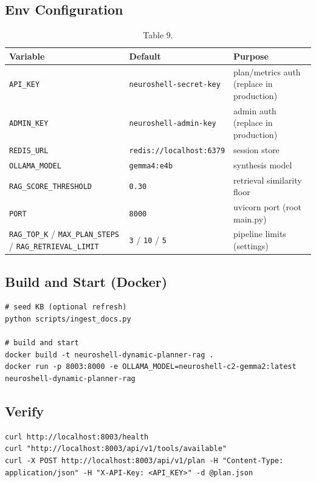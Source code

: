 \documentclass[10pt,journal,onecolumn]{IEEEtran}
\begin{document}
\subsection{Env Configuration}

\begin{table}[h]
\caption{Table 9.}
\label{tab:t9}
\begin{tabularx}{\columnwidth}{l >{\raggedright\arraybackslash}X >{\raggedright\arraybackslash}X}
\toprule
\textbf{Variable} & \textbf{Default} & \textbf{Purpose}\\
\midrule
\texttt{API\_KEY} & \texttt{neuroshell-secret-key} & plan/metrics auth (replace in production)\\
\texttt{ADMIN\_KEY} & \texttt{neuroshell-admin-key} & admin auth (replace in production)\\
\texttt{REDIS\_URL} & \texttt{redis://localhost:6379} & session store\\
\texttt{OLLAMA\_MODEL} & \texttt{gemma4:e4b} & synthesis model\\
\texttt{RAG\_SCORE\_THRESHOLD} & \texttt{0.30} & retrieval similarity floor\\
\texttt{PORT} & \texttt{8000} & uvicorn port (root main.py)\\
\texttt{RAG\_TOP\_K} / \texttt{MAX\_PLAN\_STEPS} / \texttt{RAG\_RETRIEVAL\_LIMIT} & \texttt{3} / \texttt{10} / \texttt{5} & pipeline limits (settings)\\
\bottomrule
\end{tabularx}
\end{table}

\subsection{Build and Start (Docker)}

\begin{lstlisting}
# seed KB (optional refresh)
python scripts/ingest_docs.py

# build and start
docker build -t neuroshell-dynamic-planner-rag .
docker run -p 8003:8000 -e OLLAMA_MODEL=neuroshell-c2-gemma2:latest neuroshell-dynamic-planner-rag
\end{lstlisting}

\subsection{Verify}

\begin{lstlisting}
curl http://localhost:8003/health
curl "http://localhost:8003/api/v1/tools/available"
curl -X POST http://localhost:8003/api/v1/plan -H "Content-Type: application/json" -H "X-API-Key: <API_KEY>" -d @plan.json
\end{lstlisting}
\end{document}
